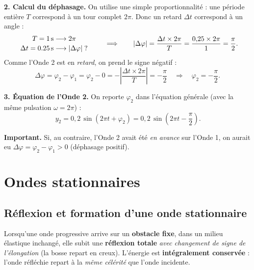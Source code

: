 \documentclass[11pt,a4paper]{article}
\begin{document}
\begin{exemple}
\smallskip
\textbf{2. Calcul du déphasage.} On utilise une simple proportionnalité : une période entière
$T$ correspond à un tour complet $2\pi$. Donc un retard $\Delta t$ correspond à un angle :
\[
\begin{array}{r@{\;\longrightarrow\;}l}
 T = \SI{1}{\second} & 2\pi \\[2pt]
 \Delta t = \SI{0.25}{\second} & |\Delta\varphi|\;?
\end{array}
\qquad\Longrightarrow\qquad
|\Delta\varphi| = \frac{\Delta t\times 2\pi}{T}
 = \frac{0{,}25\times 2\pi}{1} = \frac{\pi}{2}.
\]
Comme l'Onde 2 est en \emph{retard}, on prend le signe négatif :
\[ \Delta\varphi = \varphi_2 - \varphi_1 = \varphi_2 - 0
   = -\left|\frac{\Delta t\times 2\pi}{T}\right| = -\frac{\pi}{2}
   \quad\Longrightarrow\quad \varphi_2 = -\frac{\pi}{2}. \]

\textbf{3. Équation de l'Onde 2.} On reporte $\varphi_2$ dans l'équation générale (avec la
même pulsation $\omega = 2\pi$) :
\[ \boxed{\,y_2 = 0{,}2\,\sin\!\left(2\pi t + \varphi_2\right)
   = 0{,}2\,\sin\!\left(2\pi t - \frac{\pi}{2}\right).} \]

\textbf{Important.} Si, au contraire, l'Onde 2 avait été \emph{en avance} sur l'Onde 1, on
aurait eu $\Delta\varphi = \varphi_2 - \varphi_1 > 0$ (déphasage positif).
\end{exemple}

\section{Ondes stationnaires}
\label{sec:stationnaire}

\subsection{Réflexion et formation d'une onde stationnaire}

\begin{definition}
Lorsqu'une onde progressive arrive sur un \textbf{obstacle fixe}, dans un milieu élastique
inchangé, elle subit une \textbf{réflexion totale} \emph{avec changement de signe de
l'élongation} (la bosse repart en creux). L'énergie est \textbf{intégralement conservée} :
l'onde réfléchie repart à la \emph{même célérité} que l'onde incidente.
\end{definition}
\end{document}

